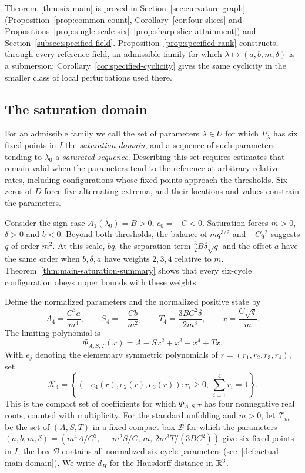Theorem~\ref{thm:six-main} is proved in Section~\ref{sec:curvature-graph}
(Proposition~\ref{prop:common-count}, Corollary~\ref{cor:four-slices} and
Propositions~\ref{prop:single-scale-six}--\ref{prop:sharp-slice-attainment})
and Section~\ref{subsec:specified-field}. Proposition~\ref{prop:specified-rank}
constructs, through every reference field, an admissible family for which
$\lambda\mapsto(a,b,m,\delta)$ is a submersion; Corollary~\ref{cor:specified-cyclicity}
gives the same cyclicity in the smaller class of local perturbations used there.

\subsection{The saturation domain}

For an admissible family we call the set of parameters $\lambda\in U$ for
which $P_\lambda$ has six fixed points in $I$ the \emph{saturation domain},
and a sequence of such parameters tending to $\lambda_0$ a \emph{saturated
sequence}. Describing this set requires estimates that remain valid when the
parameters tend to the reference at arbitrary relative rates, including
configurations whose fixed points approach the thresholds. Six zeros of $D$
force five alternating extrema, and their locations and values constrain the
parameters.

Consider the sign case $A_1(\lambda_0)=B>0$, $c_0=-C<0$. Saturation forces
$m>0$, $\delta>0$ and $b<0$. Beyond both thresholds, the balance of
$mq^{3/2}$ and $-Cq^2$ suggests $q$ of order $m^2$. At this scale, $bq$, the
separation term $\tfrac32B\delta\sqrt q$ and the offset $a$ have the same order
when $b,\delta,a$ have weights $2,3,4$ relative to $m$.
Theorem~\ref{thm:main-saturation-summary} shows that every six-cycle
configuration obeys upper bounds with these weights.

Define the normalized parameters and the normalized positive state by
\[
 A_4=\frac{C^3a}{m^4},\qquad S_4=-\frac{Cb}{m^2},\qquad
 T_4=\frac{3BC^2\delta}{2m^3},\qquad x=\frac{C\sqrt q}{m}.
\]
The limiting polynomial is
\[
 \Phi_{A,S,T}(x)=A-Sx^2+x^3-x^4+Tx.
\]
With $e_j$ denoting the elementary symmetric polynomials of
$r=(r_1,r_2,r_3,r_4)$, set
\[
 \mathcal K_4=
 \left\{(-e_4(r),e_2(r),e_3(r)):
 r_i\ge0,\ \sum_{i=1}^4r_i=1\right\}.
\]
This is the compact set of coefficients for which $\Phi_{A,S,T}$ has four
nonnegative real roots, counted with multiplicity. For the standard unfolding
and $m>0$, let $\mathscr T_m$ be the set of $(A,S,T)$ in a fixed compact box
$\mathcal B$ for which the parameters
$(a,b,m,\delta)=(m^4A/C^3,\,-m^2S/C,\,m,\,2m^3T/(3BC^2))$ give six fixed points
in $I$; the box $\mathcal B$ contains all normalized six-cycle parameters
(see~\eqref{def:actual-main-domain}). We write $d_H$ for the Hausdorff distance
in $\mathbb R^3$.

